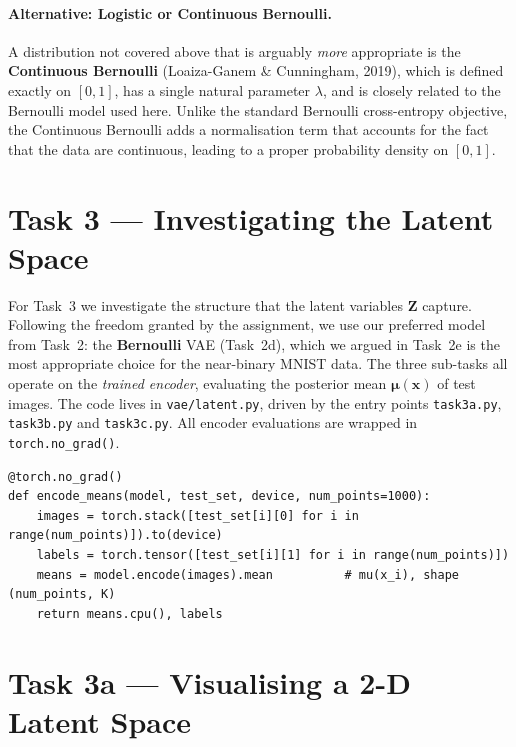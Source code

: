 \documentclass{article}
\newcommand{\bx}{\mathbf{x}}
\newcommand{\bZ}{\mathbf{Z}}
\newcommand{\bmu}{\bm{\mu}}
\begin{document}
\paragraph{Alternative: Logistic or Continuous Bernoulli.}
A distribution not covered above that is arguably \emph{more} appropriate is the
\textbf{Continuous Bernoulli} (Loaiza-Ganem \& Cunningham, 2019), which is defined
exactly on $[0,1]$, has a single natural parameter $\lambda$, and is closely related
to the Bernoulli model used here.  Unlike the standard Bernoulli cross-entropy
objective, the Continuous Bernoulli adds a normalisation term that accounts for the
fact that the data are continuous, leading to a proper probability density on $[0,1]$.

\clearpage
\section{Task 3 --- Investigating the Latent Space}

For Task~3 we investigate the structure that the latent variables $\bZ$ capture.
Following the freedom granted by the assignment, we use our preferred model from
Task~2: the \textbf{Bernoulli} VAE (Task~2d), which we argued in Task~2e is the
most appropriate choice for the near-binary MNIST data. The three sub-tasks all
operate on the \emph{trained encoder}, evaluating the posterior mean
$\bmu(\bx)$ of test images. The code lives in \texttt{vae/latent.py}, driven by
the entry points \texttt{task3a.py}, \texttt{task3b.py} and \texttt{task3c.py}.
All encoder evaluations are wrapped in \texttt{torch.no\_grad()}.

\begin{lstlisting}[caption={Evaluating the trained encoder on the first 1000 test images (\texttt{vae/latent.py}).}]
@torch.no_grad()
def encode_means(model, test_set, device, num_points=1000):
    images = torch.stack([test_set[i][0] for i in range(num_points)]).to(device)
    labels = torch.tensor([test_set[i][1] for i in range(num_points)])
    means = model.encode(images).mean          # mu(x_i), shape (num_points, K)
    return means.cpu(), labels
\end{lstlisting}

\section*{Task 3a --- Visualising a 2-D Latent Space}
\end{document}
